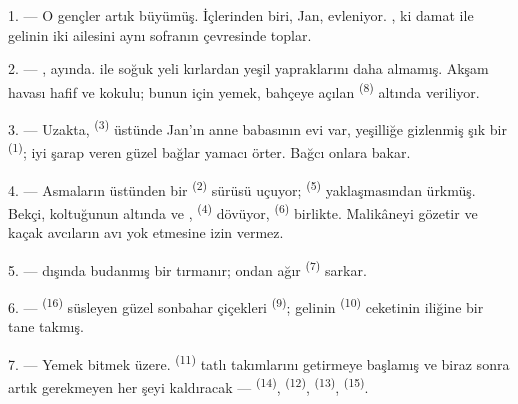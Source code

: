 
\VUsaut{4.0mm}
\VUsaut{1.6mm}
\VUsaut{3.2mm}

\VUsaut{1.6mm}
\VUsaut{2.6mm}

\VUsaut{3.0mm}

1. --- O gençler artık büyümüş. İçlerinden biri, Jan, evleniyor.
, ki damat ile gelinin iki ailesini aynı sofranın
çevresinde toplar.

2. --- ,  ayında.  ile
 soğuk yeli kırlardan yeşil yapraklarını daha almamış.
Akşam havası hafif ve kokulu; bunun için yemek, bahçeye açılan
 \textsuperscript{(8)} altında veriliyor.

3. --- Uzakta,  \textsuperscript{(3)} üstünde Jan'ın anne
babasının evi var, yeşilliğe gizlenmiş şık bir 
\textsuperscript{(1)}; iyi şarap veren güzel bağlar yamacı örter. Bağcı onlara
bakar.

4. --- Asmaların üstünden bir  \textsuperscript{(2)} sürüsü
uçuyor;  \textsuperscript{(5)} yaklaşmasından ürkmüş.
Bekçi, koltuğunun altında  ve ,
 \textsuperscript{(4)} dövüyor, 
\textsuperscript{(6)} birlikte. Malikâneyi gözetir ve kaçak avcıların avı yok
etmesine izin vermez.

5. ---  dışında budanmış bir  tırmanır;
ondan ağır  \textsuperscript{(7)} sarkar.

6. ---  \textsuperscript{(16)} süsleyen güzel sonbahar
çiçekleri  \textsuperscript{(9)}; gelinin
 \textsuperscript{(10)} ceketinin iliğine bir tane takmış.

7. --- Yemek bitmek üzere.  \textsuperscript{(11)} tatlı
takımlarını getirmeye başlamış ve biraz sonra artık gerekmeyen her şeyi
kaldıracak —  \textsuperscript{(14)}, 
\textsuperscript{(12)},  \textsuperscript{(13)},
 \textsuperscript{(15)}.

